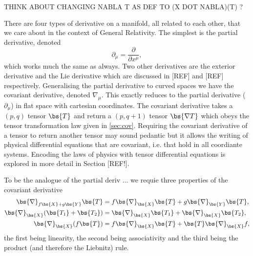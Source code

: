THINK ABOUT CHANGING NABLA T AS DEF TO (X DOT NABLA)(T) ?

There are four types of derivative on a manifold, all related to each other, that we care about in the context of General Relativity. The simplest is the partial derivative, denoted \begin{equation}\partial_\mu = \frac{\partial}{\partial x^\mu},\end{equation} which works much the same as always. Two other derivatives are the exterior derivative and the Lie derivative which are discussed in [REF] and [REF] respectively. Generalising the partial derivative to curved spaces we have the covariant derivative, denoted $\nabla_\mu$. This exactly reduces to the partial derivative ($\partial_\mu$) in flat space with cartesian coordinates. The covariant derivative takes a $(p,q)$ tensor $\bs{T}$ and return a $(p,q+1)$ tensor $\bs{\nabla T}$ which obeys the tensor transformation law given in \ref{sec:cov}. Requiring the covariant derivative of a tensor to return another tensor may sound pedantic but it allows the writing of physical differential equations that are covariant, i.e. that hold in all coordiante systems. Encoding the laws of physics with tensor differential equations is explored in more detail in Section [REF!]. 

To be the analogue of the partial deriv ... we requie three properties of the covariant derivative
\begin{align}
\label{eq:cov-lin}\bs{\nabla}_{f\bs{X} + g\bs{Y}}\bs{T} &= f\bs{\nabla}_{\bs{X}}\bs{T} + g\bs{\nabla}_{\bs{Y}}\bs{T} , \\
\label{eq:cov-ass}\bs{\nabla}_{\bs{X}}( \bs{T_1} + \bs{T_2}) &= \bs{\nabla}_{\bs{X}}\bs{T_1} + \bs{\nabla}_{\bs{X}}\bs{T_2} , \\
\label{eq:cov-pro}\bs{\nabla}_{\bs{X}}( f\bs{T}) &= f\bs{\nabla}_{\bs{X}}\bs{T} + \bs{T} \bs{\nabla}_{\bs{X}}f , 
\end{align}
the first being linearity, the second being associativity and the third being the product (and therefore the Liebnitz) rule.


